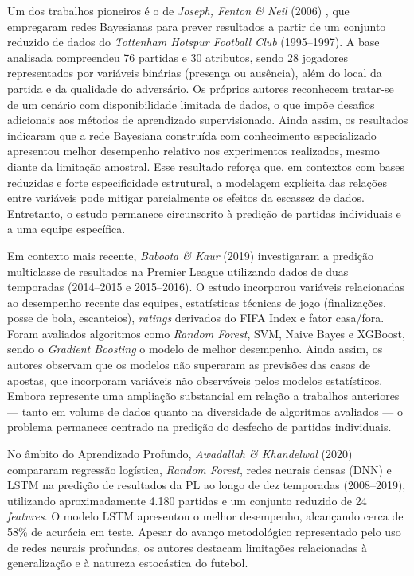 Um dos trabalhos pioneiros é o de \textit{Joseph, Fenton \& Neil} (2006) \cite{Joseph2006}, que empregaram redes Bayesianas para prever resultados a partir de um conjunto reduzido 
de dados do \textit{Tottenham Hotspur Football Club} (1995--1997). A base analisada compreendeu 76 partidas e 30 atributos, sendo 28 jogadores representados por variáveis binárias 
(presença ou ausência), além do local da partida e da qualidade do adversário. Os próprios autores reconhecem tratar-se de um cenário com disponibilidade limitada de dados, 
o que impõe desafios adicionais aos métodos de aprendizado supervisionado. Ainda assim, os resultados indicaram que a rede Bayesiana construída com conhecimento especializado 
apresentou melhor desempenho relativo nos experimentos realizados, mesmo diante da limitação amostral. Esse resultado reforça que, em contextos com bases reduzidas e 
forte especificidade estrutural, a modelagem explícita das relações entre variáveis pode mitigar parcialmente os efeitos da escassez de dados. 
Entretanto, o estudo permanece circunscrito à predição de partidas individuais e a uma equipe específica.

Em contexto mais recente, \textit{Baboota \& Kaur} (2019) \cite{Baboota2019} investigaram a predição multiclasse de resultados na Premier League utilizando dados de duas temporadas 
(2014--2015 e 2015--2016). O estudo incorporou variáveis relacionadas ao desempenho recente das equipes, estatísticas técnicas de jogo 
(finalizações, posse de bola, escanteios), \textit{ratings} derivados do FIFA Index e fator casa/fora. Foram avaliados algoritmos como \textit{Random Forest}, 
SVM, Naive Bayes e XGBoost, sendo o \textit{Gradient Boosting} o modelo de melhor desempenho. Ainda assim, os autores observam que os modelos não superaram as 
previsões das casas de apostas, que incorporam variáveis não observáveis pelos modelos estatísticos. Embora represente uma ampliação substancial em relação a trabalhos anteriores 
— tanto em volume de dados quanto na diversidade de algoritmos avaliados — o problema permanece centrado na predição do desfecho de partidas individuais.

No âmbito do Aprendizado Profundo, \textit{Awadallah \& Khandelwal} (2020) \cite{Awadallah2020} compararam regressão logística, \textit{Random Forest}, redes neurais densas (DNN) e LSTM 
na predição de resultados da PL ao longo de dez temporadas (2008--2019), utilizando aproximadamente 4.180 partidas e um conjunto reduzido de 24 \textit{features}. 
O modelo LSTM apresentou o melhor desempenho, alcançando cerca de 58\% de acurácia em teste. Apesar do avanço metodológico representado pelo uso de redes neurais profundas, 
os autores destacam limitações relacionadas à generalização e à natureza estocástica do futebol.

